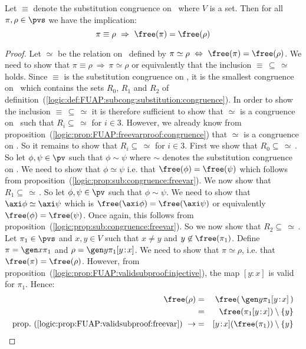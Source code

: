 \begin{prop}\label{logic:prop:FUAP:charsubcong:freevar}
Let $\equiv$ denote the substitution congruence on \pvs\ where $V$
is a set. Then for all $\pi,\rho\in\pvs$ we have the implication:
    \[
    \pi\equiv\rho\ \Rightarrow\ \free(\pi)=\free(\rho)
    \]
\end{prop}
\begin{proof}
Let $\simeq$ be the relation on \pvs\ defined by $\pi\simeq\rho\
\Leftrightarrow\ \free(\pi)=\free(\rho)$. We need to show that
$\pi\equiv\rho\ \Rightarrow\ \pi\simeq\rho$ or equivalently that the
inclusion $\equiv\,\subseteq\,\simeq$ holds. Since $\equiv$ is the
substitution congruence on \pvs, it is the smallest congruence on
\pvs\ which contains the sets $R_{0}$, $R_{1}$ and $R_{2}$ of
definition~(\ref{logic:def:FUAP:subcong:substitution:congruence}).
In order to show the inclusion $\equiv\,\subseteq\,\simeq$ it is
therefore sufficient to show that $\simeq$ is a congruence on \pvs\
such that $R_{i}\subseteq\,\simeq$ for $i\in 3$. However, we already
know from
proposition~(\ref{logic:prop:FUAP:freevarproof:congruence}) that
$\simeq$ is a congruence on \pvs. So it remains to show that
$R_{i}\subseteq\,\simeq$ for $i\in 3$. First we show that
$R_{0}\subseteq\,\simeq$\,. So let $\phi,\psi\in\pv$ such that
$\phi\sim\psi$ where $\sim$ denotes the substitution congruence on
\pv. We need to show that $\phi\simeq\psi$ i.e. that
$\free(\phi)=\free(\psi)$ which follows from
proposition~(\ref{logic:prop:sub:congruence:freevar}). We now show
that $R_{1}\subseteq\,\simeq$\,. So let $\phi,\psi\in\pv$ such that
$\phi\sim\psi$. We need to show that $\axi\phi\simeq\axi\psi$ which
is $\free(\axi\phi)=\free(\axi\psi)$ or equivalently
$\free(\phi)=\free(\psi)$. Once again, this follows from
proposition~(\ref{logic:prop:sub:congruence:freevar}). So we now
show that $R_{2}\subseteq\,\simeq$\,. Let $\pi_{1}\in\pvs$ and
$x,y\in V$ such that $x\neq y$ and $y\not\in\free(\pi_{1})$. Define
$\pi=\gen x\pi_{1}$ and $\rho=\gen y\pi_{1}[y\!:\!x]$. We need to
show that $\pi\simeq\rho$, i.e. that $\free(\pi)=\free(\rho)$.
However, from
proposition~(\ref{logic:prop:FUAP:validsubproof:injective}), the map
$[y\!:\!x]$ is valid for $\pi_{1}$. Hence:
    \begin{eqnarray*}
    \free(\rho)&=&\free(\,\gen y\pi_{1}[y\!:\!x]\,)\\
    &=&\free(\pi_{1}[y\!:\!x])\setminus\{y\}\\
    \mbox{prop.~(\ref{logic:prop:FUAP:validsubproof:freevar})}\ \rightarrow
    &=&[y\!:\!x](\free(\pi_{1}))\setminus\{y\}\\

\end{eqnarray*}
\end{proof}
